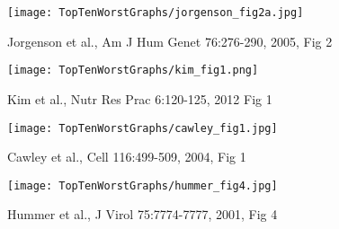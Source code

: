 \documentclass[12pt]{article}
\newcommand{\headsize}{\fontsize{35}{35} \selectfont}
\newcommand{\smallestsize}{\fontsize{18}{22} \selectfont}
\begin{document}
\headsize \color{myyellow}
\hfill \begin{minipage}{5.75in}
\end{minipage}

\vspace{30mm}

\centerline{\texttt{[image: TopTenWorstGraphs/jorgenson\_fig2a.jpg]}}

\vfill \hfill \smallestsize \color{myblue}
Jorgenson et al., Am J Hum Genet 76:276-290, 2005, Fig 2

\newpage

\headsize \color{myyellow}
\hfill \begin{minipage}{5.75in}
\end{minipage}

\vspace{30mm}

\centerline{\texttt{[image: TopTenWorstGraphs/kim\_fig1.png]}}

\vfill \hfill \smallestsize \color{myblue}
Kim et al., Nutr Res Prac 6:120-125, 2012
Fig 1

\newpage


\headsize \color{myyellow}
\hfill \begin{minipage}{5.75in}
\end{minipage}

\vspace{30mm}

\centerline{\texttt{[image: TopTenWorstGraphs/cawley\_fig1.jpg]}}

\vfill \hfill \smallestsize \color{myblue}
Cawley et al., Cell 116:499-509, 2004, Fig 1

\newpage


\headsize \color{myyellow}
\hfill \begin{minipage}{5.75in}
\end{minipage}

\vspace{30mm}

\centerline{\texttt{[image: TopTenWorstGraphs/hummer\_fig4.jpg]}}

\vfill \hfill \smallestsize \color{myblue}
Hummer et al., J Virol 75:7774-7777, 2001, Fig 4

\newpage


\headsize \color{myyellow}
\hfill \begin{minipage}{5.75in}
\end{minipage}
\end{document}
